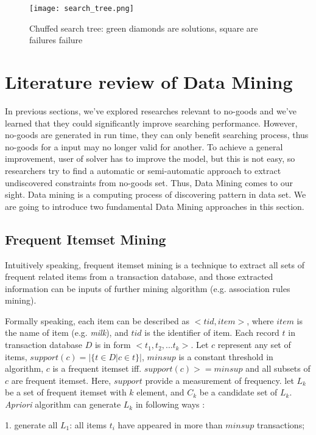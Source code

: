 \documentclass{article}
\begin{document}
\begin{figure}
    \centering
    \texttt{[image: search\_tree.png]}
    \caption{Chuffed search tree: green diamonds are solutions, square are failures failure\cite{shishmarev2016learning}}
    \label{fig:stree}
\end{figure}

\section{Literature review of Data Mining} \label{dm}
In previous sections, we've explored researches relevant to no-goods and we've learned that they could significantly improve searching performance. However, no-goods are generated in run time, they can only benefit searching process, thus  no-goods for a input may no longer valid for another. To achieve a general improvement, user of solver has to improve the model, but this is not easy, so researchers try to find a automatic or semi-automatic approach to extract undiscovered constraints from no-goods set. Thus, Data Mining comes to our sight. Data mining is a computing process of discovering pattern in data set. We are going to introduce two fundamental Data Mining approaches in this section.

\subsection{Frequent Itemset Mining}

Intuitively speaking, frequent itemset mining is a technique to extract all sets of frequent related items from a transaction database, and those extracted information can be inputs of further mining algorithm (e.g. association rules mining). 

Formally speaking, each item can be described as $<tid, item>$, where $item$ is the name of item (e.g. \textit{milk}), and $tid$ is the identifier of item. Each record $t$ in transaction database $D$ is in form $<t_1, t_2, ... t_k>$. Let $c$ represent any set of items, $support(c) = |\{t \in D | c \in t\}|$, $minsup$ is a constant threshold in algorithm, $c$ is a frequent itemset iff. $support(c) >= minsup$ and all subsets of $c$ are frequent itemset. Here, $support$ provide a measurement of frequency. let $L_k$ be a set of  frequent itemset with $k$ element, and $C_k$ be a candidate set of $L_k$. \textit{Apriori} algorithm can generate $L_k$ in following ways \cite{agrawal1994fast}:

1. generate all $L_1$: all items $t_i$ have appeared in more than $minsup$ transactions;
\end{document}
